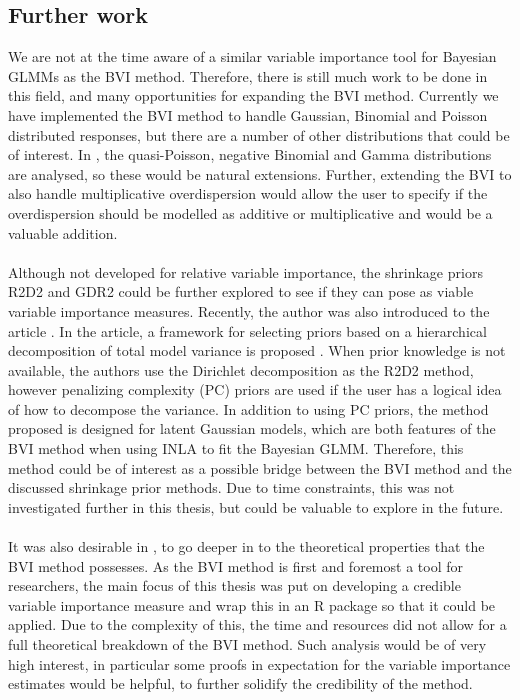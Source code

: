 \subsection*{Further work}
We are not at the time aware of a similar variable importance tool for Bayesian GLMMs as the BVI method. Therefore, there is still much work to be done in this field, and many opportunities for expanding the BVI method. Currently we have implemented the BVI method to handle Gaussian, Binomial and Poisson distributed responses, but there are a number of other distributions that could be of interest. In \citet{nakagawa2017}, the quasi-Poisson, negative Binomial and Gamma distributions are analysed, so these would be natural extensions. Further, extending the BVI to also handle multiplicative overdispersion would allow the user to specify if the overdispersion should be modelled as additive or multiplicative and would be a valuable addition.
\\
\\
Although not developed for relative variable importance, the shrinkage priors R2D2 and GDR2 could be further explored to see if they can pose as viable variable importance measures. Recently, the author was also introduced to the article \citet{Fuglstad2020_joint_priors}. In the article, a framework for selecting priors based on a hierarchical decomposition of total model variance is proposed \citep{Fuglstad2020_joint_priors}. When prior knowledge is not available, the authors use the Dirichlet decomposition as the R2D2 method, however penalizing complexity (PC) priors are used if the user has a logical idea of how to decompose the variance. In addition to using PC priors, the method proposed is designed for latent Gaussian models, which are both features of the BVI method when using INLA to fit the Bayesian GLMM. Therefore, this method could be of interest as a possible bridge between the BVI method and the discussed shrinkage prior methods. Due to time constraints, this was not investigated further in this thesis, but could be valuable to explore in the future.
\\
\\
It was also desirable in \citet{Arnstad:Relative_variable_importance_in_Bayesian_linear_mixed_models:2024}, to go deeper in to the theoretical properties that the BVI method possesses. As the BVI method is first and foremost a tool for researchers, the main focus of this thesis was put on developing a credible variable importance measure and wrap this in an R package so that it could be applied. Due to the complexity of this, the time and resources did not allow for a full theoretical breakdown of the BVI method. Such analysis would be of very high interest, in particular some proofs in expectation for the variable importance estimates would be helpful, to further solidify the credibility of the method. 
